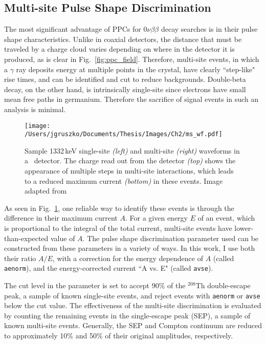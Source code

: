 \subsection{Multi-site Pulse Shape Discrimination}
The most significant advantage of PPCs for $0\nu\beta\beta$ decay searches is in their pulse shape characteristics. Unlike in coaxial detectors, the distance that must be traveled by a charge cloud varies depending on where in the detector it is produced, as is clear in Fig.~\ref{fig:ppc_field}. Therefore, multi-site events, in which a $\gamma$ ray deposits energy at multiple points in the crystal, have clearly ``step-like" rise times, and can be identified and cut to reduce backgrounds. Double-beta decay, on the other hand, is intrinsically single-site since electrons have small mean free paths in germanium. Therefore the sacrifice of signal events in such an analysis is minimal. 

\begin{figure}[]
 \centering
 \texttt{[image: /Users/jgruszko/Documents/Thesis/Images/Ch2/ms\_wf.pdf]}
 \caption[Sample single- and multi-site waveforms in a \ppc\ detector]{Sample 1332\,keV single-site \textit{(left)} and multi-site \textit{(right)} waveforms in a \ppc\ detector. The charge read out from the detector \textit{(top)} shows the appearance of multiple steps in multi-site interactions, which leads to a reduced maximum current \textit{(bottom)} in these events. Image adapted from \cite{Cooper2011}} 
 \label{fig:PSD_wf}
\end{figure}%

As seen in Fig.~\ref{fig:PSD_wf}, one reliable way to identify these events is through the difference in their maximum current $A$. For a given energy $E$ of an event, which is proportional to the integral of the total current, multi-site events have lower-than-expected value of $A$. The pulse shape discrimination parameter used can be constructed from these parameters in a variety of ways. In this work, I use both their ratio $A/E$, with a correction for the energy dependence of $A$ \cite{Budjas2009} (called {\tt aenorm}), and the energy-corrected current ``A vs. E" (called {\tt avse})\cite{AvsE_unidoc}. 

The cut level in the parameter is set to accept 90\% of the $^{208}$Th double-escape peak, a sample of known single-site events, and reject events with {\tt aenorm} or {\tt avse} below the cut value. The effectiveness of the multi-site discrimination is evaluated by counting the remaining events in the single-escape peak (SEP), a sample of known multi-site events. Generally, the SEP and Compton continuum are reduced to approximately 10\% and 50\% of their original amplitudes, respectively.

